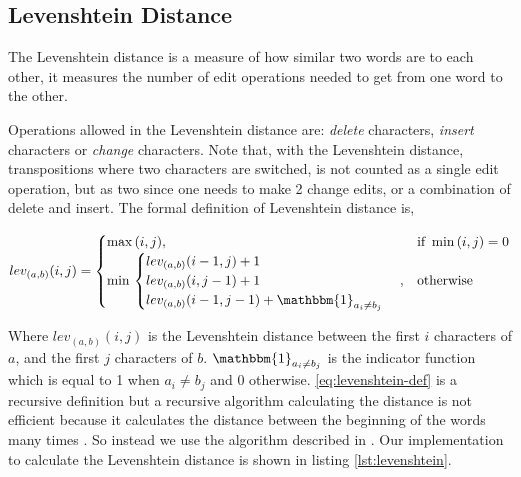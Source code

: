 \subsection{Levenshtein Distance}
The Levenshtein distance is a measure of how similar two words are to each other, it measures the number of edit operations needed to get from one word to the other. 

Operations allowed in the Levenshtein distance are: \emph{delete} characters, \emph{insert} characters or \emph{change} characters. Note that, with the Levenshtein distance, transpositions where two characters are switched, is not counted as a single edit operation, but as two since one needs to make 2 change edits, or a combination of delete and insert. The formal definition of Levenshtein distance is,

\begin{equation}  
lev_{(a,b)}(i,j) = 
	\begin{cases} 
		\max{(i,j)}, & \text{if}\ \min{(i,j) = 0} \\
		\min{} \begin{cases}
					lev_{(a,b)}(i-1,j) + 1 \\
					lev_{(a,b)}(i,j-1) + 1 \\
					lev_{(a,b)}(i-1,j-1) + \mathbbm{1}_{a_{i} \neq b_{j}} \\
				\end{cases} , & \text{otherwise}
	\end{cases}
\label{eq:levenshtein-def}
\end{equation}

Where \(lev_{(a,b)}(i,j)\) is the Levenshtein distance between the first \(i\) characters of \(a\), and the first \(j\) characters of \(b\). \(\mathbbm{1}_{a_{i} \neq b_{j}}\) is the indicator function which is equal to 1 when \(a_{i} \neq b_{j}\) and 0 otherwise.
\eqref{eq:levenshtein-def} is a recursive definition but a recursive algorithm calculating the distance is not efficient because it calculates the distance between the beginning of the words many times \cite{wikiLeven}. So instead we use the algorithm described in \cite{WF1974}. Our implementation to calculate the Levenshtein distance is shown in listing \ref{lst:levenshtein}.
 
